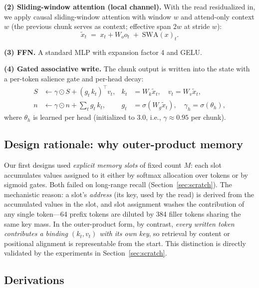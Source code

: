 \documentclass[11pt]{article}
\newcommand{\swa}{\mathrm{SWA}}
\begin{document}
\textbf{(2) Sliding-window attention (local channel).} With the read residualized in,
we apply causal sliding-window attention with window $w$ and attend-only context $w$
(the previous chunk serves as context; effective span $2w$ at stride $w$):
\begin{equation}
\tilde{x}_t \;=\; x_t + W_o o_t \;+\; \swa(x)_t .
\end{equation}

\textbf{(3) FFN.} A standard MLP with expansion factor 4 and GELU.

\textbf{(4) Gated associative write.} The chunk output is written into the state with a
per-token salience gate and per-head decay:
\begin{align}
S &\leftarrow \gamma \odot S + (g_t\, k_t)^{\top} v_t,
& k_t &= W_k \tilde{x}_t, \quad v_t = W_v \tilde{x}_t, \\
n &\leftarrow \gamma \odot n + \textstyle\sum_t g_t\, k_t, &
g_t &= \sigma(W_g \tilde{x}_t), \quad \gamma_h = \sigma(\theta_h),
\end{align}
where $\theta_h$ is learned per head (initialized to $3.0$, i.e., $\gamma\approx0.95$
per chunk).

\subsection{Design rationale: why outer-product memory}

Our first designs used \emph{explicit memory slots} of fixed count $M$: each slot
accumulates values assigned to it either by softmax allocation over tokens or by sigmoid
gates. Both failed on long-range recall (Section~\ref{sec:scratch}). The mechanistic
reason: a slot's \emph{address} (its key, used by the read) is derived from the
accumulated values in the slot, and slot assignment washes the contribution of any single
token---64 prefix tokens are diluted by 384 filler tokens sharing the same key mass. In
the outer-product form, by contrast, \emph{every written token contributes a binding
$(k_t, v_t)$ with its own key}, so retrieval by content or positional alignment is
representable from the start. This distinction is directly validated by the experiments
in Section~\ref{sec:scratch}.

\subsection{Derivations}\label{sec:derivations}
\end{document}
